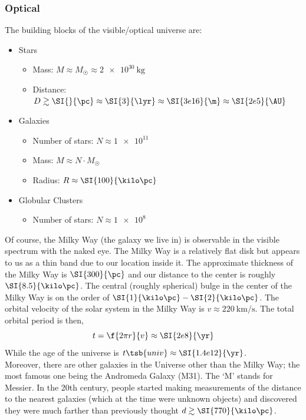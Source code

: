 \documentclass{article}
\begin{document}
\subsubsection{Optical}
The building blocks of the visible/optical universe are:
\begin{itemize}
    \item Stars
    \begin{itemize}
        \item Mass: $M \approx M_{\astrosun} \approx \SI{2e30}{\kg}$
        \item Distance: $D \gtrsim \SI{}{\pc} \approx \SI{3}{\lyr} \approx \SI{3e16}{\m} \approx \SI{2e5}{\AU} $
    \end{itemize}
    \item Galaxies
    \begin{itemize}
        \item Number of stars: $N \approx \SI{1e11}{}$
        \item Mass: $M \approx N \cdot M_{\astrosun}$
        \item Radius: $R \approx \SI{100}{\kilo\pc}$
    \end{itemize}
    \item Globular Clusters
    \begin{itemize}
        \item Number of stars: $N \approx \SI{1e8}{}$
    \end{itemize}
\end{itemize}

Of course, the Milky Way (the galaxy we live in) is observable in the visible spectrum with the naked eye. The Milky Way is a relatively flat disk but appears to us as a thin band due to our location inside it. The approximate thickness of the Milky Way is $\SI{300}{\pc}$ and our distance to the center is roughly $\SI{8.5}{\kilo\pc}$. The central (roughly spherical) bulge in the center of the Milky Way is on the order of $\SI{1}{\kilo\pc}-\SI{2}{\kilo\pc}$. The orbital velocity of the solar system in the Milky Way is $v \approx \SI{220}{\km\per\s}$. The total orbital period is then,
\[ t = \f{2\pi r}{v} \approx \SI{2e8}{\yr} \]
While the age of the universe is $t\tsb{univ} \approx \SI{1.4e12}{\yr}$. \\

Moreover, there are other galaxies in the Universe other than the Milky Way; the most famous one being the Andromeda Galaxy (M31). The `M' stands for Messier. In the 20th century, people started making measurements of the distance to the nearest galaxies (which at the time were unknown objects) and discovered they were much farther than previously thought $d \gtrsim \SI{770}{\kilo\pc}$. \\
\end{document}
